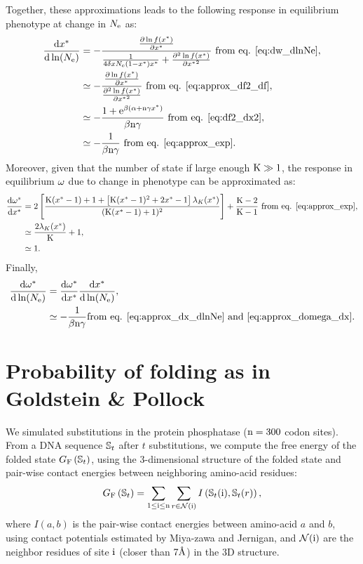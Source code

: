 \documentclass{article}
\begin{document}
Together, these approximations leads to the following response in equilibrium phenotype at change in $N_{\mathrm{e}}$ as:
\begin{align}
\frac{ \mathrm{d} x^{*}}{\mathrm{d} \ln (N_{\mathrm{e}})} & = - \frac{\frac{ \partial \ln f(x^{*}) }{\partial {x^{*}}}}{\frac{1}{4 \delta x N_{\mathrm{e}}  (1 - x^{*}) x^{*}} + \frac{ \partial^2 \ln f(x^{*}) }{\partial {x^{*}}^2}}\text{ from eq. \ref{eq:dw_dlnNe}}, \\
& \simeq - \frac{\frac{ \partial \ln f(x^{*}) }{\partial {x^{*}}}}{\frac{ \partial^2 \ln f(x^{*}) }{\partial {x^{*}}^2}}\text{ from eq. \ref{eq:approx_df2_df}}, \\
& \simeq - \frac{1 + \mathrm{e}^{\beta(\alpha + \text{n} \gamma x^{*})}}{\beta \text{n} \gamma}\text{ from eq. \ref{eq:df2_dx2}}, \\
& \simeq - \frac{1}{\beta \text{n} \gamma}\text{ from eq. \ref{eq:approx_exp}}. \label{eq:approx_dx_dlnNe}
\end{align}
Moreover, given that the number of state if large enough $\text{K} \gg 1$, the response in equilibrium $\omega$ due to change in phenotype can be approximated as:
\begin{align}
\frac{ \mathrm{d} \omega^{*}}{\mathrm{d} x^{*}}  & = 2 \left[ \frac{\text{K} (x^{*}- 1) + 1+\left[\text{K} (x^{*}-1)^2+2 x^{*}-1\right] \lambda_{K}(x^{*}) }{(\text{K} (x^{*}-1)+1)^2}\right] + \frac{\text{K} - 2}{\text{K} - 1}\text{ from eq. \ref{eq:approx_exp}}, \\
& \simeq \frac{2 \lambda_{K}(x^{*})}{\text{K}} + 1, \\
& \simeq 1. \label{eq:approx_domega_dx}
\end{align}
Finally,
\begin{align}
\frac{ \mathrm{d} \omega^{*}}{\mathrm{d} \ln (N_{\mathrm{e}})}  & = \frac{ \mathrm{d} \omega^{*}}{\mathrm{d} x^{*}}  \frac{ \mathrm{d} x^{*}}{\mathrm{d} \ln (N_{\mathrm{e}})}, \\
  & \simeq - \frac{1}{\beta \text{n} \gamma} \text{from eq. \ref{eq:approx_dx_dlnNe} and \ref{eq:approx_domega_dx}}.
\end{align}


\section*{Probability of folding as in Goldstein \& Pollock}
We simulated substitutions in the protein phosphatase ($\text{n}=300$ codon sites).
From a DNA sequence $\mathbb{S}_{t}$ after $t$ substitutions, we compute the free energy of the folded state $G_{\mathrm{F}}\left(\mathbb{S}_{t}\right)$, using the $3$-dimensional structure of the folded state and pair-wise contact energies between neighboring amino-acid residues:
\begin{equation}
G_{\mathrm{F}}\left(\mathbb{S}_{t}\right) = \sum_{1 \leq \text{i} \leq \text{n}} \sum_{r \in \mathcal{N}(\text{i})} I \left(\mathbb{S}_{t}(\text{i}), \mathbb{S}_{t}(r) \right),
\end{equation}
where $I(a,b)$ is the pair-wise contact energies between amino-acid $a$ and $b$, using contact potentials estimated by Miya-zawa and Jernigan, and $\mathcal{N}(\text{i})$ are the neighbor residues of site $\text{i}$ (closer than $7\text{\normalfont\AA}$) in the $3$D structure.\\
\end{document}
